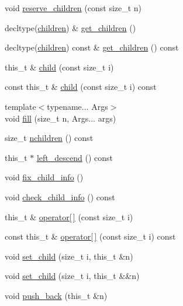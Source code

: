 \begin{DoxyCompactItemize}
\item 
void \hyperlink{class_base_node_abb32a7d0574ed17ddeb61e7262d090ad}{reserve\+\_\+children} (const size\+\_\+t n)
\item 
decltype(\hyperlink{class_base_node_af2f245862083d173c950fca048c03546}{children}) \& \hyperlink{class_base_node_a7177763ffa8b3e658124c586dde30be9}{get\+\_\+children} ()
\item 
decltype(\hyperlink{class_base_node_af2f245862083d173c950fca048c03546}{children}) const  \& \hyperlink{class_base_node_aec98c1640e03a27d1663f876bc49ef69}{get\+\_\+children} () const
\item 
this\+\_\+t \& \hyperlink{class_base_node_ac2ed3b362a2563e86063a157daa1c288}{child} (const size\+\_\+t i)
\item 
const this\+\_\+t \& \hyperlink{class_base_node_a2e244ddbbc0edea5f648e2a900e9dd99}{child} (const size\+\_\+t i) const
\item 
{\footnotesize template$<$typename... Args$>$ }\\void \hyperlink{class_base_node_aa7e88efda898c45f84ab0d79d4bb85c2}{fill} (size\+\_\+t n, Args... args)
\item 
size\+\_\+t \hyperlink{class_base_node_abae4d16401a958dc41d2852dedcf0721}{nchildren} () const
\item 
this\+\_\+t $\ast$ \hyperlink{class_base_node_ad319f28caf14e730bc62560f1bd682b6}{left\+\_\+descend} () const
\item 
void \hyperlink{class_base_node_ad0ef64be7c40f1e9f9170d8d51f8d3bf}{fix\+\_\+child\+\_\+info} ()
\item 
void \hyperlink{class_base_node_a83b33d8a8902819b4175b66fb6e4b08e}{check\+\_\+child\+\_\+info} () const
\item 
this\+\_\+t \& \hyperlink{class_base_node_a6aec587267d880a8f87312d90e74af56}{operator\mbox{[}$\,$\mbox{]}} (const size\+\_\+t i)
\item 
const this\+\_\+t \& \hyperlink{class_base_node_ad09bee05b19581e8827bdd03a31791a7}{operator\mbox{[}$\,$\mbox{]}} (const size\+\_\+t i) const
\item 
void \hyperlink{class_base_node_a575b94703d0c67ba8c04b6a725b48b56}{set\+\_\+child} (size\+\_\+t i, this\+\_\+t \&n)
\item 
void \hyperlink{class_base_node_a7c2892c91eb31bc0d72bfb0c57ec8dea}{set\+\_\+child} (size\+\_\+t i, this\+\_\+t \&\&n)
\item 
void \hyperlink{class_base_node_ab5a808e3ec22f8061022f9ec286d4a03}{push\+\_\+back} (this\+\_\+t \&n)
\item 

\end{DoxyCompactItemize}
